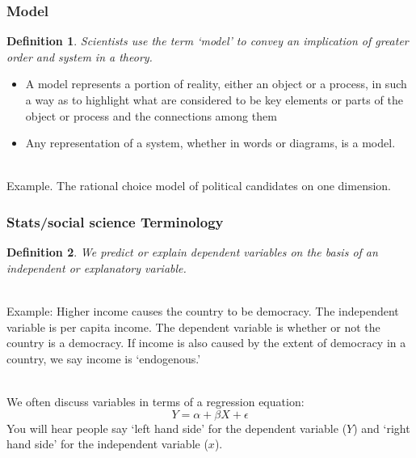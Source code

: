 \documentclass[aspectratio=169, handout]{beamer}
\newtheorem{defn}{Definition}
\numberwithin{equation}{section}
\begin{document}
\begin{frame}
\frametitle{Model}

\begin{defn}
Scientists use the term `model' to convey an implication of greater order and system in a theory.
\end{defn} \pause

\begin{itemize}
\item A model represents a portion of reality, either an object or a process, in such a way as to highlight what are considered to be key elements or parts of the object or process and the connections among them
\item Any representation of a system, whether in words or diagrams, is a model.
\end{itemize}\pause

\ \\Example. The rational choice model of political candidates on one dimension.

\end{frame}



\begin{frame}
\frametitle{Stats/social science Terminology}

\begin{defn}
We predict or explain dependent variables on the basis of an independent or explanatory variable.  
\end{defn} \pause

\ \\Example: Higher income causes the country to be democracy. The independent variable is per capita income. The dependent variable is whether or not the country is a democracy.\pause
If income is also caused by the extent of democracy in a country, we say income is `endogenous.'\pause

\ \\We often discuss variables in terms of a regression equation:
$$Y = \alpha +\beta X +\epsilon$$
You will hear people say `left hand side' for the dependent variable ($Y$) and `right hand side' for the independent variable ($x$). 

\end{frame}
\end{document}
